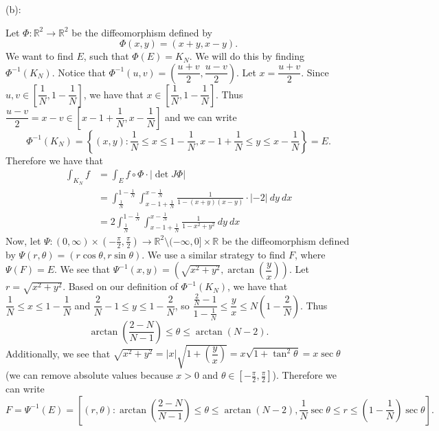 \documentclass{../../../tex-setup/eh-homework}
\begin{document}
\begin{question}{38}
    (b):

    Let \(\Phi : \mathbb{R}^2 \to \mathbb{R}^2\) be the diffeomorphism defined by
    \[
        \Phi (x,y) = (x+y, x-y).
    \]
    We want to find \(E\), such that \(\Phi (E) = K_N\). We will do this by finding \(\Phi ^{-1}(K_N)\). Notice that \(\Phi ^{-1}(u,v) = \left( \dfrac{u+v}{2}, \dfrac{u-v}{2} \right)\). Let \(x = \dfrac{u+v}{2}\). Since \(u,v \in \left[ \dfrac{1}{N}, 1- \dfrac{1}{N} \right] \), we have that \(x \in \left[ \dfrac{1}{N}, 1 - \dfrac{1}{N}\right]\). Thus \(\dfrac{u - v}{2} = x - v \in \left[ x - 1 + \dfrac{1}{N}, x - \dfrac{1}{N} \right]\) and we can write
    \[
        \Phi ^{-1}(K_N) = \left\{ (x,y) : \frac{1}{N} \leq x \leq 1 - \frac{1}{N}, x - 1 + \frac{1}{N} \leq y \leq x - \frac{1}{N}\right\} = E.
    \]
    Therefore we have that
    \begin{align*}
        \int _{K_N} f &= \int _E f \circ \Phi \cdot \left\vert \det J \Phi \right\vert \\
        &= \int _{\frac{1}{N}}^{1-\frac{1}{N}} \int _{x - 1 + \frac{1}{N}}^{x-\frac{1}{N}} \frac{1}{1 - (x + y)(x-y)}\cdot | -2 |\ dy\ dx \\
        &= 2\int _{\frac{1}{N}}^{1-\frac{1}{N}} \int _{x - 1 + \frac{1}{N}}^{x-\frac{1}{N}} \frac{1}{1 - x^2 + y^2}\ dy\ dx
    \end{align*}
    Now, let \(\Psi : (0, \infty)\times (-\frac{\pi}{2}, \frac{\pi}{2}) \to \mathbb{R}^2 \setminus (-\infty , 0] \times \mathbb{R}\) be the diffeomorphism defined by \(\Psi (r,\theta) = (r\cos \theta , r\sin \theta)\). We use a similar strategy to find \(F\), where \(\Psi (F) = E\). We see that \(\Psi ^{-1}(x,y) = \left( \sqrt{x^2 + y^2} , \arctan \left( \dfrac{y}{x} \right) \right)\). Let \(r = \sqrt{x^2 + y^2}\). Based on our definition of \(\Phi ^{-1}(K_N)\), we have that \(\dfrac{1}{N} \leq x \leq 1 - \dfrac{1}{N}\) and \(\dfrac{2}{N} - 1 \leq y \leq 1 - \dfrac{2}{N}\), so \(\dfrac{\frac{2}{N} - 1}{1 - \frac{1}{N}} \leq \dfrac{y}{x} \leq N\left(1-\dfrac{2}{N}\right)\). Thus
    \[
        \arctan \left( \frac{2-N}{N-1} \right) \leq \theta \leq \arctan (N-2).
    \]
    Additionally, we see that \(\sqrt{x^2 + y^2} = |x|\sqrt{1 + \left(\dfrac{y}{x}\right)} = x\sqrt{1 + \tan^2 \theta} = x\sec \theta\) (we can remove absolute values because \(x > 0\) and \(\theta \in \left[ -\frac{\pi}{2}, \frac{\pi}{2} \right] \)). Therefore we can write
    \[
        F = \Psi ^{-1}(E) = \left[ (r, \theta) : \arctan \left( \frac{2-N}{N-1} \right) \leq \theta \leq \arctan (N-2), \frac{1}{N}\sec \theta \leq r \leq \left( 1-\frac{1}{N} \right)\sec \theta \right].
\]
\end{question}
\end{document}
